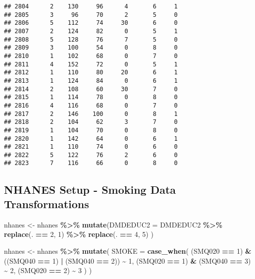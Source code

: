 \documentclass[
]{article}
\newenvironment{Shaded}{\begin{snugshade}}{\end{snugshade}}
\newcommand{\AttributeTok}[1]{\textcolor[rgb]{0.13,0.29,0.53}{#1}}
\newcommand{\DecValTok}[1]{\textcolor[rgb]{0.00,0.00,0.81}{#1}}
\newcommand{\FunctionTok}[1]{\textcolor[rgb]{0.13,0.29,0.53}{\textbf{#1}}}
\newcommand{\NormalTok}[1]{#1}
\newcommand{\OtherTok}[1]{\textcolor[rgb]{0.56,0.35,0.01}{#1}}
\newcommand{\SpecialCharTok}[1]{\textcolor[rgb]{0.81,0.36,0.00}{\textbf{#1}}}
\begin{document}
\begin{verbatim}
## 2804      2    130     96      4       6     1
## 2805      3     96     70      2       5     0
## 2806      5    112     74     30       6     0
## 2807      2    124     82      0       5     1
## 2808      5    128     76      7       5     0
## 2809      3    100     54      0       8     0
## 2810      1    102     68      0       7     0
## 2811      4    152     72      0       5     1
## 2812      1    110     80     20       6     1
## 2813      1    124     84      0       6     1
## 2814      2    108     60     30       7     0
## 2815      1    114     78      0       8     0
## 2816      4    116     68      0       7     0
## 2817      2    146    100      0       8     1
## 2818      2    104     62      3       7     0
## 2819      1    104     70      0       8     0
## 2820      1    142     64      0       6     1
## 2821      1    110     74      0       6     0
## 2822      5    122     76      2       6     0
## 2823      7    116     66      0       8     0
\end{verbatim}

\subsection{NHANES Setup - Smoking Data
Transformations}\label{nhanes-setup---smoking-data-transformations}

\begin{Shaded}
\begin{Highlighting}[]
\NormalTok{nhanes }\OtherTok{\textless{}{-}}\NormalTok{ nhanes }\SpecialCharTok{\%\textgreater{}\%} 
  \FunctionTok{mutate}\NormalTok{(}\AttributeTok{DMDEDUC2 =}\NormalTok{ DMDEDUC2 }\SpecialCharTok{\%\textgreater{}\%} 
    \FunctionTok{replace}\NormalTok{(. }\SpecialCharTok{==} \DecValTok{2}\NormalTok{, }\DecValTok{1}\NormalTok{) }\SpecialCharTok{\%\textgreater{}\%}
    \FunctionTok{replace}\NormalTok{(. }\SpecialCharTok{==} \DecValTok{4}\NormalTok{, }\DecValTok{5}\NormalTok{)}
\NormalTok{  )}

\NormalTok{nhanes }\OtherTok{\textless{}{-}}\NormalTok{ nhanes }\SpecialCharTok{\%\textgreater{}\%} 
  \FunctionTok{mutate}\NormalTok{(}
    \AttributeTok{SMOKE =} \FunctionTok{case\_when}\NormalTok{(}
\NormalTok{      (SMQ020 }\SpecialCharTok{==} \DecValTok{1}\NormalTok{) }\SpecialCharTok{\&}\NormalTok{ ((SMQ040 }\SpecialCharTok{==} \DecValTok{1}\NormalTok{) }\SpecialCharTok{|}\NormalTok{ (SMQ040 }\SpecialCharTok{==} \DecValTok{2}\NormalTok{)) }\SpecialCharTok{\textasciitilde{}} \DecValTok{1}\NormalTok{,}
\NormalTok{      (SMQ020 }\SpecialCharTok{==} \DecValTok{1}\NormalTok{) }\SpecialCharTok{\&}\NormalTok{ (SMQ040 }\SpecialCharTok{==} \DecValTok{3}\NormalTok{) }\SpecialCharTok{\textasciitilde{}} \DecValTok{2}\NormalTok{,}
\NormalTok{      (SMQ020 }\SpecialCharTok{==} \DecValTok{2}\NormalTok{) }\SpecialCharTok{\textasciitilde{}} \DecValTok{3}
\NormalTok{    )}
\NormalTok{  )}
\end{Highlighting}
\end{Shaded}
\end{document}
